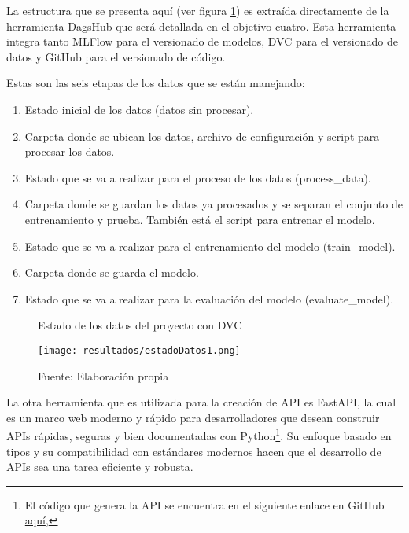 \newpage

La estructura que se presenta aquí (ver figura \ref{fig:figuraEstadoDatos}) es extraída directamente de la herramienta DagsHub que será detallada en el objetivo cuatro. Esta herramienta integra tanto MLFlow para el versionado de modelos, DVC para el versionado de datos y GitHub para el versionado de código.
\newline

Estas son las seis etapas de los datos que se están manejando:

\begin{enumerate}
	\item Estado inicial de los datos (datos sin procesar).
	\item Carpeta donde se ubican los datos, archivo de configuración y script para procesar los datos.
	\item Estado que se va a realizar para el proceso de los datos (process\_data).
	\item Carpeta donde se guardan los datos ya procesados y se separan el conjunto de entrenamiento y prueba. También está el script para entrenar el modelo.
	\item Estado que se va a realizar para el entrenamiento del modelo (train\_model).
	\item Carpeta donde se guarda el modelo.
	\item Estado que se va a realizar para la evaluación del modelo (evaluate\_model).
\end{enumerate}

\newpage

\begin{figure}[h]
\centering
\caption{Estado de los datos del proyecto con DVC}
\texttt{[image: resultados/estadoDatos1.png]}
\caption*{\footnotesize Fuente: Elaboración propia}
\label{fig:figuraEstadoDatos}
\end{figure}

\newpage

La otra herramienta que es utilizada para la creación de API es FastAPI, la cual es un marco web moderno y rápido para desarrolladores que desean construir APIs rápidas, seguras y bien documentadas con Python\footnote{El código que genera la API se encuentra en el siguiente enlace en GitHub \href{https://github.com/juferoto/mlops_project/tree/master/application/src}{aquí},}. Su enfoque basado en tipos y su compatibilidad con estándares modernos hacen que el desarrollo de APIs sea una tarea eficiente y robusta.

